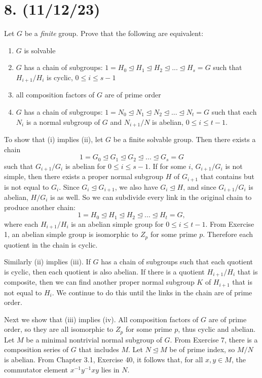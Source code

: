 \documentclass{article}
\begin{document}
\section*{8. (11/12/23)}

Let $G$ be a \emph{finite} group. Prove that the following are equivalent:
\begin{enumerate}[label=(\roman*), itemsep=0em]
    \item $G$ is solvable
    \item $G$ has a chain of subgroups: $1 = H_0 \unlhd H_1 \unlhd H_2 \unlhd ... \unlhd H_s = G$ such that $H_{i + 1}/H_i$ is cyclic, $0 \leq i \leq s - 1$
    \item all composition factors of $G$ are of prime order
    \item $G$ has a chain of subgroups: $1 = N_0 \unlhd N_1 \unlhd N_2 \unlhd ... \unlhd N_t = G$ such that each $N_i$ is a normal subgroup of $G$ and $N_{i + 1}/N$ is abelian, $0 \leq i \leq t - 1$.
\end{enumerate}

To show that (i) implies (ii), let $G$ be a finite solvable group. Then there exists a chain
\begin{equation*}
    1 = G_0 \unlhd G_1 \unlhd G_2 \unlhd ... \unlhd G_s = G
\end{equation*}
such that $G_{i + 1}/G_i$ is abelian for $0 \leq i \leq s - 1$. If for some $i$, $G_{i + 1}/G_i$ is not simple, then there exists a proper normal subgroup $H$ of $G_{i + 1}$ that contains but is not equal to $G_i$. Since $G_i \unlhd G_{i + 1}$, we also have $G_i \unlhd H$, and since $G_{i + 1}/G_i$ is abelian, $H/G_i$ is as well. So we can subdivide every link in the original chain to produce another chain:
\begin{equation*}
    1 = H_0 \unlhd H_1 \unlhd H_2 \unlhd ... \unlhd H_t = G,
\end{equation*}
where each $H_{i + 1}/H_i$ is an abelian simple group for $0 \leq i \leq t - 1$. From Exercise 1, an abelian simple group is isomorphic to $Z_p$ for some prime $p$. Therefore each quotient in the chain is cyclic.

Similarly (ii) implies (iii). If $G$ has a chain of subgroups such that each quotient is cyclic, then each quotient is also abelian. If there is a quotient $H_{i + 1}/H_i$ that is composite, then we can find another proper normal subgroup $K$ of $H_{i + 1}$ that is not equal to $H_i$. We continue to do this until the links in the chain are of prime order.

Next we show that (iii) implies (iv). All composition factors of $G$ are of prime order, so they are all isomorphic to $Z_p$ for some prime $p$, thus cyclic and abelian. Let $M$ be a minimal nontrivial normal subgroup of $G$. From Exercise 7, there is a composition series of $G$ that includes $M$. Let $N \unlhd M$ be of prime index, so $M/N$ is abelian. From Chapter 3.1, Exercise 40, it follows that, for all $x, y \in M$, the commutator element $x^{-1}y^{-1}xy$ lies in $N$. 
\end{document}
